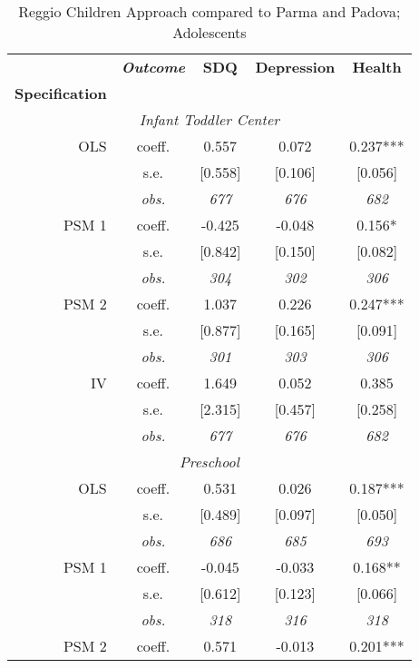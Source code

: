 \begin{table}[H]		
\caption{Reggio Children Approach compared to Parma and Padova; Adolescents}					
\label{tab:resultsAdo-parmapadova}					
 \begin{centering}		
\vspace{1ex}					
\begin{tabular}{ r c ccc}		
\hline \hline		
 & \textbf{\textit{Outcome}} & \textbf{SDQ}  & \textbf{Depression} & \textbf{Health}  \\		
\textbf{Specification}  &  &  &  &  \\		
\hline		
\multicolumn{5}{c}{\textit{Infant Toddler Center }} \\		
\hline		
					
OLS	 & coeff.	 & 0.557	 & 0.072	 & 0.237***	\\
	 & s.e.	 & [0.558]	 & [0.106]	 & [0.056]	\\
	 & \textit{obs.}	 & \textit{677}	 & \textit{676}	 & \textit{682}	\\
PSM 1	 & coeff.	 & -0.425	 & -0.048	 & 0.156*	\\
	 & s.e.	 & [0.842]	 & [0.150]	 & [0.082]	\\
	 & \textit{obs.}	 & \textit{304}	 & \textit{302}	 & \textit{306}	\\
PSM 2	 & coeff.	 & 1.037	 & 0.226	 & 0.247***	\\
	 & s.e.	 & [0.877]	 & [0.165]	 & [0.091]	\\
	 & \textit{obs.}	 & \textit{301}	 & \textit{303}	 & \textit{306}	\\
IV	 & coeff.	 & 1.649	 & 0.052	 & 0.385	\\
	 & s.e.	 & [2.315]	 & [0.457]	 & [0.258]	\\
	 & \textit{obs.}	 & \textit{677}	 & \textit{676}	 & \textit{682}	\\
\hline \multicolumn{5}{c}{\textit{Preschool }} \\ \hline					
OLS	 & coeff.	 & 0.531	 & 0.026	 & 0.187***	\\
	 & s.e.	 & [0.489]	 & [0.097]	 & [0.050]	\\
	 & \textit{obs.}	 & \textit{686}	 & \textit{685}	 & \textit{693}	\\
PSM 1	 & coeff.	 & -0.045	 & -0.033	 & 0.168**	\\
	 & s.e.	 & [0.612]	 & [0.123]	 & [0.066]	\\
	 & \textit{obs.}	 & \textit{318}	 & \textit{316}	 & \textit{318}	\\
PSM 2	 & coeff.	 & 0.571	 & -0.013	 & 0.201***	\\

\end{tabular}
\end{centering}
\end{table}
